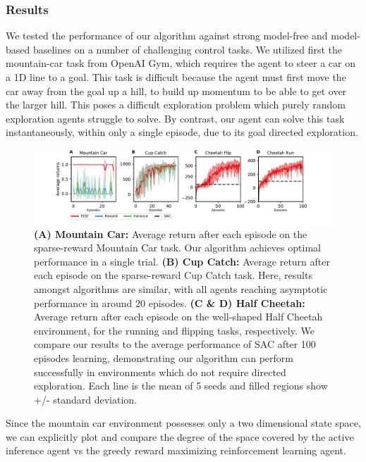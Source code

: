 \subsubsection{Results}

We tested the performance of our algorithm against strong model-free and model-based baselines on a number of challenging control tasks. We utilized first the mountain-car task from OpenAI Gym, which requires the agent to steer a car on a 1D line to a goal. This task is difficult because the agent must first move the car away from the goal up a hill, to build up momentum to be able to get over the larger hill. This poses a difficult exploration problem which purely random exploration agents struggle to solve. By contrast, our agent can solve this task instantaneously, within only a single episode, due to its goal directed exploration.

\begin{figure}[h]
   \centering 
      \includegraphics[width=15cm]{chapter_4_figures/RLAI_performance.pdf}
      \caption{\textbf{(A) Mountain Car:} Average return after each episode on the sparse-reward Mountain Car task. Our algorithm achieves optimal performance in a single trial. \textbf{(B) Cup Catch:} Average return after each episode on the sparse-reward Cup Catch task. Here, results amongst algorithms are similar, with all agents reaching asymptotic performance in around 20 episodes. \textbf{(C \& D) Half Cheetah:} Average return after each episode on the well-shaped Half Cheetah environment, for the running and flipping tasks, respectively. We compare our results to the average performance of SAC after 100 episodes learning, demonstrating our algorithm can perform successfully in environments which do not require directed exploration. Each line is the mean of 5 seeds and filled regions show +/- standard deviation.}
   \end{figure}

Since the mountain car environment possesses only a two dimensional state space, we can explicitly plot and compare the degree of the space covered by the active inference agent vs the greedy reward maximizing reinforcement learning agent.

